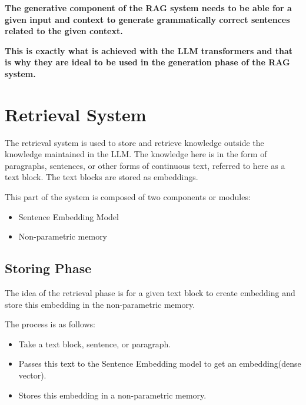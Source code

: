 \documentclass{wseas}
\begin{document}
\textbf{The generative component of the RAG system needs to be able for
a given input and context to generate grammatically correct sentences
related to the given context.}

\textbf{This is exactly what is achieved with the LLM transformers and
that is why they are ideal to be used in the generation phase of the RAG
system.}

\section{Retrieval System}

The retrieval system is used to store and retrieve knowledge outside the
knowledge maintained in the LLM. The knowledge here is in the form of
paragraphs, sentences, or other forms of continuous text, referred to
here as a text block. The text blocks are stored as embeddings.

This part of the system is composed of two components or modules:

\begin{itemize}

\item
  Sentence Embedding Model
\item
  Non-parametric memory
\end{itemize}

\subsection{Storing Phase}

The idea of the retrieval phase is for a given text block to create
embedding and store this embedding in the non-parametric memory.

The process is as follows:

\begin{itemize}
\item
  \begin{enumerate}
    Take a text block, sentence, or paragraph.
  \end{enumerate}
\item
  \begin{enumerate}
    Passes this text to the Sentence Embedding model to get an
    embedding(dense vector).
  \end{enumerate}
\item
  \begin{enumerate}
    Stores this embedding in a non-parametric memory.
  \end{enumerate}
\end{itemize}
\end{document}
